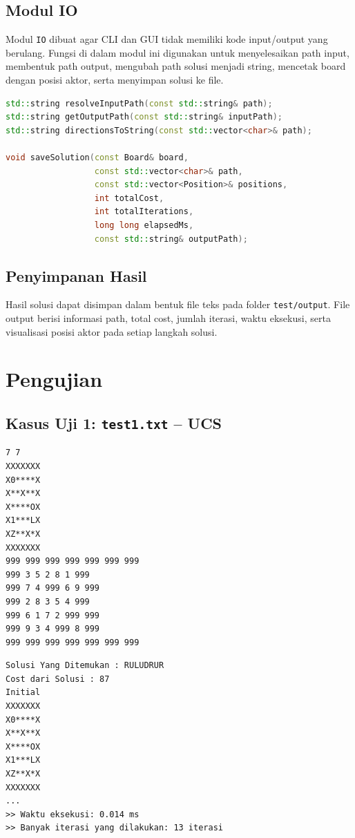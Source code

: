 \documentclass[a4paper,11pt]{article}
\begin{document}
\subsection{Modul IO}
Modul \texttt{IO} dibuat agar CLI dan GUI tidak memiliki kode input/output yang berulang. Fungsi di dalam modul ini digunakan untuk menyelesaikan path input, membentuk path output, mengubah path solusi menjadi string, mencetak board dengan posisi aktor, serta menyimpan solusi ke file.

\begin{lstlisting}[language=C++, caption=Fungsi IO Bersama]
std::string resolveInputPath(const std::string& path);
std::string getOutputPath(const std::string& inputPath);
std::string directionsToString(const std::vector<char>& path);

void saveSolution(const Board& board,
                  const std::vector<char>& path,
                  const std::vector<Position>& positions,
                  int totalCost,
                  int totalIterations,
                  long long elapsedMs,
                  const std::string& outputPath);
\end{lstlisting}

\subsection{Penyimpanan Hasil}
Hasil solusi dapat disimpan dalam bentuk file teks pada folder \texttt{test/output}. File output berisi informasi path, total cost, jumlah iterasi, waktu eksekusi, serta visualisasi posisi aktor pada setiap langkah solusi.

\section{Pengujian}

\subsection{Kasus Uji 1: \texttt{test1.txt} -- UCS}

\noindent\begin{minipage}[t]{0.52\textwidth}
\begin{lstlisting}[basicstyle=\ttfamily\scriptsize, numbers=none, title=Input: test1.txt]
7 7
XXXXXXX
X0****X
X**X**X
X****OX
X1***LX
XZ**X*X
XXXXXXX
999 999 999 999 999 999 999
999 3 5 2 8 1 999
999 7 4 999 6 9 999
999 2 8 3 5 4 999
999 6 1 7 2 999 999
999 9 3 4 999 8 999
999 999 999 999 999 999 999
\end{lstlisting}
\end{minipage}%
\hfill%
\begin{minipage}[t]{0.44\textwidth}
\begin{lstlisting}[basicstyle=\ttfamily\scriptsize, numbers=none, title=Output]
Solusi Yang Ditemukan : RULUDRUR
Cost dari Solusi : 87
Initial
XXXXXXX
X0****X
X**X**X
X****OX
X1***LX
XZ**X*X
XXXXXXX
...
>> Waktu eksekusi: 0.014 ms
>> Banyak iterasi yang dilakukan: 13 iterasi
\end{lstlisting}
\end{minipage}
\end{document}
